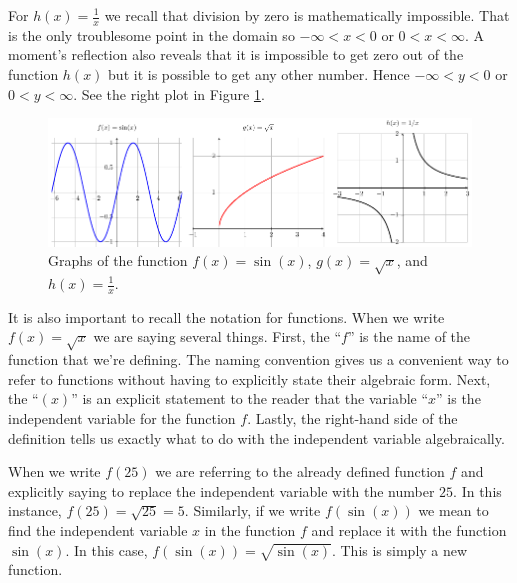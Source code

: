 For $h(x) = \frac{1}{x}$ we recall that division by zero is mathematically impossible.
That is the only troublesome point in the domain so $-\infty < x < 0$ or $0 < x < \infty$.
A moment's reflection also reveals that it is impossible to get zero out of the function
$h(x)$ but it is possible to get any other number.  Hence $-\infty < y < 0$ or $0 < y <
\infty$. See the right plot in Figure \ref{f:0.1ex1}. 
\afterex
\begin{figure}
    \includegraphics[width=0.95\columnwidth]{figures/0-1-ex1.pdf}
    \caption{Graphs of the function $f(x) = \sin(x)$, $g(x) = \sqrt{x}$, and $h(x) =
    \frac{1}{x}$.}
    \label{f:0.1ex1}
\end{figure}

% 

It is also important to recall the notation for functions.  When we write $f(x) =
\sqrt{x}$ we are saying several things.  First, the ``$f$'' is the name of the function
that we're defining.  The naming convention gives us a convenient way to refer to
functions without having to explicitly state their algebraic form.  Next, the ``$(x)$'' is
an explicit statement to the reader that the variable ``$x$'' is the independent variable
for the function $f$.  Lastly, the right-hand side of the definition tells us exactly what
to do with the independent variable algebraically.  

When we write $f(25)$ we are referring to the already defined function $f$ and explicitly
saying to replace the independent variable with the number $25$.  In this instance, $f(25)
= \sqrt{25} = 5$.  Similarly, if we write $f(\sin(x))$ we mean to find the independent
variable $x$ in the function $f$ and replace it with the function $\sin(x)$.  In this
case, $f(\sin(x)) = \sqrt{\sin(x)}$.  This is simply a new function.

